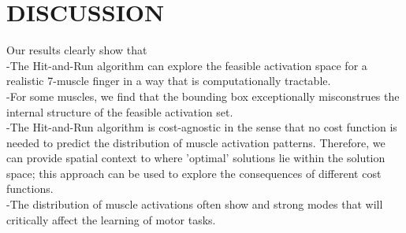 \section{DISCUSSION}

Our results clearly show that\\
-The Hit-and-Run algorithm can explore the feasible activation space for a realistic 7-muscle finger in a way that is computationally tractable.\\
-For some muscles, we find that the bounding box exceptionally misconstrues the internal structure of the feasible activation set.\\
-The Hit-and-Run algorithm is cost-agnostic in the sense that no cost function is needed to predict the distribution of muscle activation patterns. Therefore, we can provide spatial context to where 'optimal' solutions lie within the solution space; this approach can be used to explore the consequences of different cost functions.\\
-The distribution of muscle activations often show and strong modes that will critically affect the learning of motor tasks.


